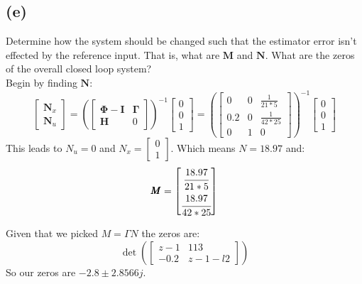\documentclass{article}
\begin{document}
\subsection*{(e)}
Determine how the system should be changed such that the estimator error isn't effected by the reference input. That is, what are $\pmb{M}$ and $\pmb{N}$. What are the zeros of the overall closed loop system?\\
Begin by finding $\pmb{N}$:
\[\begin{bmatrix}\pmb{N}_x\\\pmb{N}_u\end{bmatrix}=\left (\begin{bmatrix}\pmb{\Phi}-\pmb{I}&\pmb{\Gamma}\\\pmb{H}&0\end{bmatrix}\right)^{-1}\begin{bmatrix}0\\0\\1\end{bmatrix}=\left (\begin{bmatrix}0&0&\frac{1}{21*5}\\0.2&0&\frac{1}{42*25}\\0&1&0\end{bmatrix}\right )^{-1}\begin{bmatrix}0\\0\\1\end{bmatrix}\]
This leads to $N_u=0$ and $N_x=\begin{bmatrix}0\\1\end{bmatrix}$. Which means $N=18.97$ and:
\[\pmb{M}=\begin{bmatrix}\cfrac{18.97}{21*5}\\[0.7em]\cfrac{18.97}{42*25}\end{bmatrix}\]

Given that we picked $M=\Gamma N$ the zeros are:
\[\det\left (\begin{bmatrix}z-1&113\\-0.2&z-1-l2\end{bmatrix}\right )\]
So our zeros are $-2.8\pm 2.8566j$.
\end{document}
